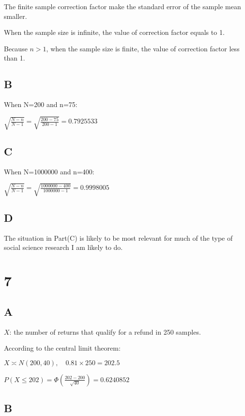 \documentclass{article}
\begin{document}
	The finite sample correction factor make the standard error of the sample mean smaller.
	
	When the sample size is infinite, the value of correction factor equals to 1.
	
	
	
	Because $n>1$, when the sample size is finite, the value of correction factor less than 1.
	
	\subsection*{B}
	
	When N=200 and n=75:
	
	$\sqrt{\frac{N-n}{N-1}}=\sqrt{\frac{200-75}{200-1}}=0.7925533$
	
	\subsection*{C}
	
	When N=1000000 and n=400:
	
	$\sqrt{\frac{N-n}{N-1}}=\sqrt{\frac{1000000-400}{1000000-1}}=0.9998005$
	
	\subsection*{D}
	
	The situation in Part(C) is likely to be most relevant for much of the type of social science research I am likely to do.
	
	\section*{7}
	
	\subsection*{A}
	
	$X$: the number of returns that qualify for a refund in 250 samples.
	
	According to the central limit theorem:
	
	$X\asymp N(200,40),\quad 0.81\times 250=202.5$
	
	$P(X\le 202)=\Phi(\frac{202-200}{\sqrt{40}})=0.6240852$
	
	\subsection*{B}
	
\end{document}
